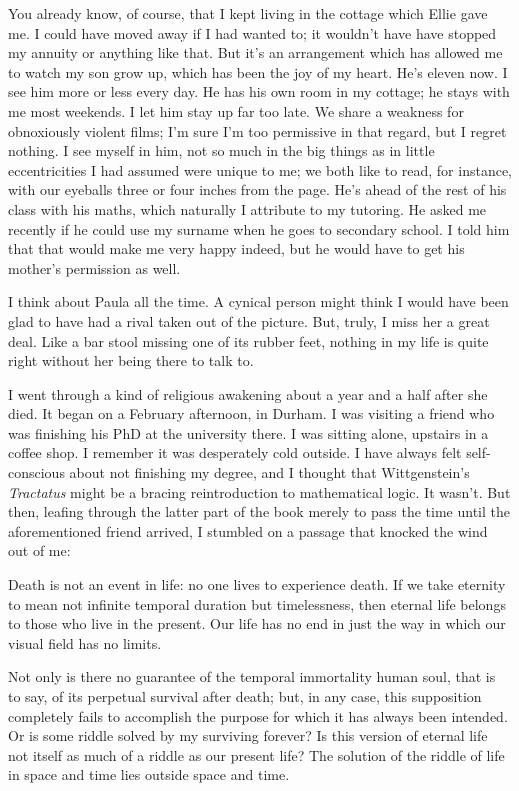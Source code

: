 You already know, of course, that I kept living in the cottage which Ellie gave me. I could have moved away if I had wanted to; it wouldn't have have stopped my annuity or anything like that. But it's an arrangement which has allowed me to watch my son grow up, which has been the joy of my heart. He's eleven now. I see him more or less every day. He has his own room in my cottage; he stays with me most weekends. I let him stay up far too late. We share a weakness for obnoxiously violent films; I'm sure I'm too permissive in that regard, but I regret nothing. I see myself in him, not so much in the big things as in little eccentricities I had assumed were unique to me; we both like to read, for instance, with our eyeballs three or four inches from the page. He's ahead of the rest of his class with his maths, which naturally I attribute to my tutoring. He asked me recently if he could use my surname when he goes to secondary school. I told him that that would make me very happy indeed, but he would have to get his mother's permission as well.

I think about Paula all the time. A cynical person might think I would have been glad to have had a rival taken out of the picture. But, truly, I miss her a great deal. Like a bar stool missing one of its rubber feet, nothing in my life is quite right without her being there to talk to.

I went through a kind of religious awakening about a year and a half after she died. It began on a February afternoon, in Durham. I was visiting a friend who was finishing his PhD at the university there. I was sitting alone, upstairs in a coffee shop. I remember it was desperately cold outside. I have always felt self-conscious about not finishing my degree, and I thought that Wittgenstein's \textit{Tractatus} might be a bracing reintroduction to mathematical logic. It wasn't. But then, leafing through the latter part of the book merely to pass the time until the aforementioned friend arrived, I stumbled on a passage that knocked the wind out of me:

\begin{quoting}
    Death is not an event in life: no one lives to experience death. If we take eternity to mean not infinite temporal duration but timelessness, then eternal life belongs to those who live in the present. Our life has no end in just the way in which our visual field has no limits.

    Not only is there no guarantee of the temporal immortality human soul, that is to say, of its perpetual survival after death; but, in any case, this supposition completely fails to accomplish the purpose for which it has always been intended. Or is some riddle solved by my surviving forever? Is this version of eternal life not itself as much of a riddle as our present life? The solution of the riddle of life in space and time lies outside space and time.
\end{quoting}

